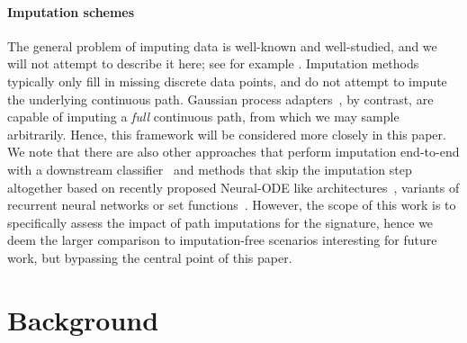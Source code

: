 \documentclass{article}
\begin{document}
\paragraph{Imputation schemes} The general problem of imputing data is well-known and well-studied, and
we will not attempt to describe it here; see for example \citet[Chapter 25]{gelman2007dataanalysis}.
Imputation methods typically only fill in missing discrete data
points, and do not attempt to impute the underlying continuous path.
Gaussian process adapters~\citep{li2016scalable}, by contrast, are
capable of imputing a \emph{full} continuous path, from which we
may sample arbitrarily. Hence, this framework will be
considered more closely in this paper.
We note that there are also other approaches that
perform imputation end-to-end with a downstream classifier~\citep{shukla2018interpolationprediction}
and methods that skip the imputation step altogether based on recently proposed Neural-ODE like architectures~\citep{rubanova2019latent, kidger2020neuralcde}, variants of recurrent neural networks \cite{che2018recurrent} or set functions~\cite{horn2019set}.
However, the scope of this work is to specifically assess the impact of path imputations for the signature, hence we deem the larger comparison to imputation-free scenarios interesting for future work, but bypassing the central point of this paper.

\section{Background} %
\end{document}
